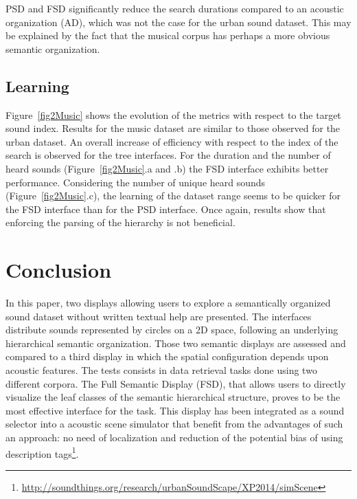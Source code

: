 \documentclass{aes2e}
\newcommand{\nm}[1]{\textcolor{magenta}{nm: #1}}
\begin{document}
PSD and FSD significantly reduce the search durations compared to an acoustic organization (AD), which was not the case for the urban sound dataset. This may be explained by the fact that the musical corpus has perhaps a more obvious semantic organization.

\subsection{Learning}

Figure~\ref{fig2Music} shows the evolution of the metrics with respect to the target sound index. Results for the music dataset are similar to those observed for the urban dataset. An overall increase of efficiency with respect to the index of the search is observed for the tree interfaces. For the duration and the number of heard sounds (Figure~\ref{fig2Music}.a and .b) the FSD interface exhibits better performance. Considering the number of unique heard sounds (Figure~\ref{fig2Music}.c), the learning of the dataset range seems to be quicker for the FSD interface than for the PSD interface. Once again, results show that enforcing the parsing of the hierarchy is not beneficial.

\section{Conclusion}


In this paper, two displays allowing users to explore a semantically organized sound dataset without written textual help are presented. The interfaces distribute sounds represented by circles on a 2D space, following an underlying hierarchical semantic organization. Those two semantic displays are assessed and compared to a third display in which the spatial configuration depends upon acoustic features. The tests consists in data retrieval tasks done using two different corpora. 
The Full Semantic Display (FSD), that allows users to directly visualize the leaf classes of the semantic hierarchical structure, proves to be the most effective interface for the task. This display has been integrated as a sound selector into a acoustic scene simulator that benefit from the advantages of such an approach: no need of localization and reduction of the potential bias of using description tags\footnote{\url{http://soundthings.org/research/urbanSoundScape/XP2014/simScene}}. 
\end{document}
